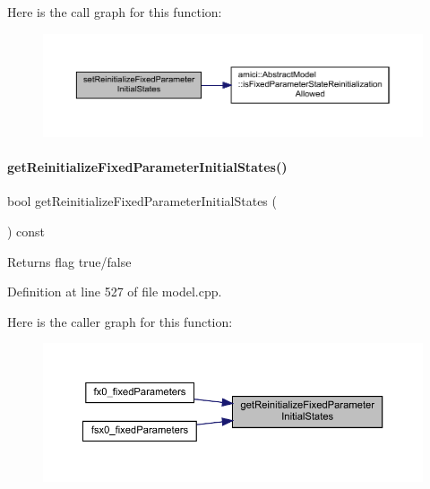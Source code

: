 Here is the call graph for this function\+:
\nopagebreak
\begin{figure}[H]
\begin{center}
\leavevmode
\includegraphics[width=350pt]{classamici_1_1_model_aaf26e3d4c8b574bc7e63f8beea677bcb_cgraph}
\end{center}
\end{figure}
\mbox{\label{classamici_1_1_model_a09f372616ff7bf8073c732801b666f7e}} 
\paragraph{\texorpdfstring{getReinitializeFixedParameterInitialStates()}{getReinitializeFixedParameterInitialStates()}}
{\footnotesize\ttfamily bool get\+Reinitialize\+Fixed\+Parameter\+Initial\+States (\begin{DoxyParamCaption}{ }\end{DoxyParamCaption}) const}

\begin{DoxyReturn}{Returns}
flag true/false 
\end{DoxyReturn}


Definition at line 527 of file model.\+cpp.

Here is the caller graph for this function\+:
\nopagebreak
\begin{figure}[H]
\begin{center}
\leavevmode
\includegraphics[width=350pt]{classamici_1_1_model_a09f372616ff7bf8073c732801b666f7e_icgraph}
\end{center}
\end{figure}
\mbox{\label{classamici_1_1_model_ae183370edb2ee04786aba8eb25c805f4}} 
